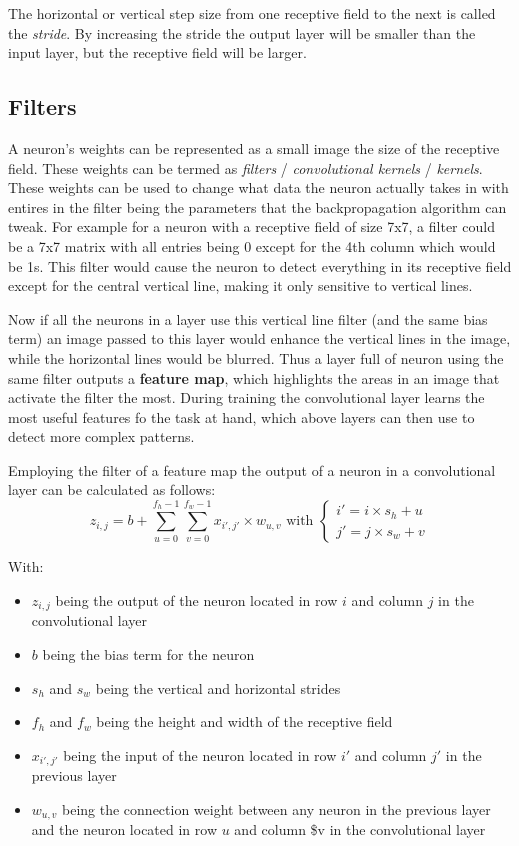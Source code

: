 \documentclass[12pt letter]{report}
\begin{document}
The horizontal or vertical step size from one receptive field to the
next is called the \emph{stride}. By increasing the stride the output
layer will be smaller than the input layer, but the receptive field will
be larger.

\subsection{Filters}\label{filters}

A neuron's weights can be represented as a small image the size of the
receptive field. These weights can be termed as \emph{filters} /
\emph{convolutional kernels} / \emph{kernels}. These weights can be used
to change what data the neuron actually takes in with entires in the
filter being the parameters that the backpropagation algorithm can
tweak. For example for a neuron with a receptive field of size 7x7, a
filter could be a 7x7 matrix with all entries being 0 except for the 4th
column which would be 1s. This filter would cause the neuron to detect
everything in its receptive field except for the central vertical line,
making it only sensitive to vertical lines.

Now if all the neurons in a layer use this vertical line filter (and the
same bias term) an image passed to this layer would enhance the vertical
lines in the image, while the horizontal lines would be blurred. Thus a
layer full of neuron using the same filter outputs a \textbf{feature
map}, which highlights the areas in an image that activate the filter
the most. During training the convolutional layer learns the most useful
features fo the task at hand, which above layers can then use to detect
more complex patterns.

Employing the filter of a feature map the output of a neuron in a
convolutional layer can be calculated as follows: \[
z_{i, j} = b + \displaystyle\sum_{u=0}^{f_h-1} \displaystyle\sum_{v=0}^{f_w-1} x_{i', j'} \times w_{u, v} \text{ with } \begin{cases}
i' = i \times s_h + u \\
j' = j \times s_w + v
\end{cases}
\]

With:

\begin{itemize}
\item
  \(z_{i,j}\) being the output of the neuron located in row \(i\) and
  column \(j\) in the convolutional layer
\item
  \(b\) being the bias term for the neuron
\item
  \(s_h\) and \(s_w\) being the vertical and horizontal strides
\item
  \(f_h\) and \(f_w\) being the height and width of the receptive field
\item
  \(x_{i', j'}\) being the input of the neuron located in row \(i'\) and
  column \(j'\) in the previous layer
\item
  \(w_{u,v}\) being the connection weight between any neuron in the
  previous layer and the neuron located in row \(u\) and column \$v in
  the convolutional layer
\end{itemize}
\end{document}
